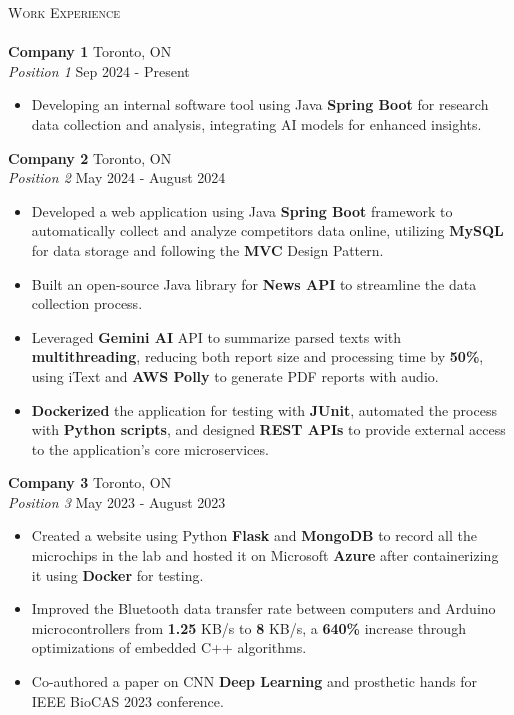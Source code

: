 \documentclass[a4paper]{article}
\newcommand{\lineunder} {
    \vspace*{-8pt} \\
    \hspace*{-18pt} \hrulefill \hspace*{-0.5cm} \\
}
\newcommand{\header} [1] {
    {\hspace*{-18pt}\vspace*{6pt} \textsc{#1}}
    \vspace*{-6pt} \lineunder
}
\begin{document}
\header{Work Experience}
\vspace{1mm}
\textbf{Company 1} \hfill Toronto, ON\\
\textit{Position 1} \hfill Sep 2024 - Present\\
\vspace{-1mm}
\begin{itemize} \itemsep 1pt
	\item Developing an internal software tool using Java \textbf{Spring Boot} for research data collection and analysis,
integrating AI models for enhanced insights.
\end{itemize}
\textbf{Company 2} \hfill Toronto, ON\\
\textit{Position 2} \hfill May 2024 - August 2024\\
\vspace{-1mm}
\begin{itemize} \itemsep 1pt
	\item Developed a web application using Java \textbf{Spring Boot} framework to automatically collect and analyze competitors\textquotesingle{} data online, utilizing \textbf{MySQL} for data storage and following the \textbf{MVC} Design Pattern.
        \item Built an open-source Java 
 library for \textbf{News API} to streamline the data collection process.
	\item Leveraged \textbf{Gemini AI} API to summarize parsed texts with \textbf{multithreading}, reducing both report size and processing time by \textbf{50\%}, using iText and \textbf{AWS Polly} to generate PDF reports with audio.
	\item \textbf{Dockerized} the application for testing with \textbf{JUnit}, automated the process with \textbf{Python scripts}, and designed \textbf{REST APIs} to provide external access to the application's core microservices. 
\end{itemize}
\textbf{Company 3} \hfill Toronto, ON\\
\textit{Position 3} \hfill May 2023 - August 2023\\
\vspace{-1mm}
\begin{itemize} \itemsep 1pt
	\item Created a website using Python \textbf{Flask} and \textbf{MongoDB} to record all the microchips in the lab and
hosted it on Microsoft \textbf{Azure} after containerizing it using \textbf{Docker} for testing.
        \item Improved the Bluetooth data transfer rate between computers and Arduino microcontrollers from \textbf{1.25} KB/s to \textbf{8} KB/s, a \textbf{640\%} increase through optimizations of embedded C++ algorithms.
	\item Co-authored a paper on CNN \textbf{Deep Learning} and prosthetic hands for IEEE BioCAS 2023 conference.
\end{itemize}
\end{document}
